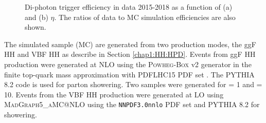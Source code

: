 \begin{figure}[htbp]
    \centering
    \caption{Di-photon trigger efficiency in data 2015-2018 as a function of (a) \eT and (b) $\eta$. The ratios of data to MC simulation efficiencies are also shown.}
    \label{fig:HHyybb:Data&MC:Trig}
\end{figure}
The simulated \HHyybb sample (MC) are generated from two production modes, the ggF HH and VBF HH as describe in Section \ref{chap1:HH:HPD}. Events from ggF HH production were generated at NLO using the \textsc{Powheg-Box} v2 generator in the finite top-quark mass approximation with PDFLHC15 PDF set \cite{HH_FT, HH_Powheg, PDF4LHC}. The \textsc{PYTHIA} 8.2 code is used for parton showering. Two samples were generated for \kl= 1 and \kl= 10. Events from the VBF HH production were generated at LO  using \textsc{MadGraph5\_aMC@NLO} \cite{HH_VBF} using the \texttt{NNPDF3.0nnlo} PDF set \cite{VBF_PDF} and \textsc{PYTHIA} 8.2 for showering. \\

